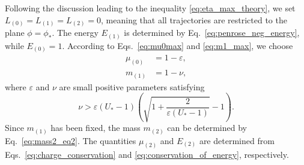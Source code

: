 Following the discussion leading to the inequality \eqref{eq:eta_max_theory}, we set $L_{(0)}=L_{(1)}=L_{(2)}=0$, meaning that all trajectories are restricted to the plane $\phi=\phi_*$. The energy $E_{(1)}$ is determined by Eq.~\eqref{eq:penrose_neg_energy}, while $E_{(0)}=1$. According to Eqs.~\eqref{eq:mu0max} and \eqref{eq:m1_max}, we choose
\begin{eqnarray}
  \label{eq:epsilondef} \mu_{(0)} &= 1 - \varepsilon, \\
  \label{eq:nudef} m_{(1)} &= 1 - \nu,
\end{eqnarray}
where $\varepsilon$ and $\nu$ are small positive parameters satisfying
\begin{equation} \label{eq:nuepsilonrelation}
  \nu > \varepsilon (U_* - 1) \left( \sqrt{1 + \frac{2}{\varepsilon (U_* - 1)}} - 1 \right).
\end{equation}
Since $m_{(1)}$  has been fixed, the mass $m_{(2)}$ can be determined by Eq.~\eqref{eq:mass2_eq2}. The quantities $\mu_{(2)}$ and $E_{(2)}$ are determined from Eqs.~\eqref{eq:charge_conservation} and \eqref{eq:conservation_of_energy}, respectively.

